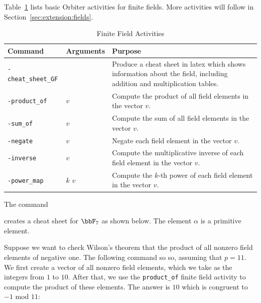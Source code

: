\bigskip


Table~\ref{tab:finitefield:activities} lists basic Orbiter activities for finite fields. 
More activities will follow in Section~\ref{sec:extension:fields}.  
\begin{table}
	\begin{center}
	\begin{tabular}{|p{4cm}|p{3cm}|p{7cm}|}
		\hline
		Command & Arguments & Purpose \\
		\hline
		\hline
		\verb'-cheat_sheet_GF' &  &  Produce a cheat sheet in latex which shows information about the field, including addition and multiplication tables.  \\
		\hline
		\verb'-product_of' & $v$ &  Compute the product of all field elements in the vector $v$.  \\
		\hline
		\verb'-sum_of' & $v$ &  Compute the sum of all field elements in the vector $v$.  \\
		\hline
		\verb'-negate' & $v$ &  Negate each field element in the vector $v$.  \\
		\hline
		\verb'-inverse' & $v$ &  Compute the multiplicative inverse of each field element in the vector $v$.  \\
		\hline
		\verb'-power_map' & $k$ $v$ &  Compute the $k$-th power of each field element in the vector $v$.  \\
		\hline
		\end{tabular}
	\end{center}
	\caption{\label{tab:finitefield:activities}Finite Field Activities}
	\end{table}
The command  
{\tt

}
creates a cheat sheet for $\bbF_7$ as shown below. 
The element $\alpha$ is a primitive element. 

\bigskip



\begin{mdframed}[style=MyFrame]

\end{mdframed}



\bigskip



Suppose we want to check Wilson's theorem that the product of all nonzero field elements of negative one.
The following command so so, assuming that $p = 11.$ We first create a vector of all 
nonzero field elements, which we take as the integers from $1$ to $10$. After that, 
we use the \verb'product_of' finite field activity to compute the product of these elements. 
The answer is $10$ which is congruent to $-1$ mod $11:$
{\tt

}


